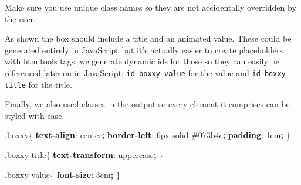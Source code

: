\documentclass[
]{krantz}
\makeatletter
\newenvironment{Shaded}{\begin{snugshade}}{\end{snugshade}}
\newcommand{\CommentTok}[1]{\textcolor[rgb]{0.37,0.37,0.37}{\textit{#1}}}
\newcommand{\ConstantTok}[1]{\textcolor[rgb]{0,0,0}{#1}}
\newcommand{\ControlFlowTok}[1]{\textcolor[rgb]{0.27,0.27,0.27}{\textbf{#1}}}
\newcommand{\DataTypeTok}[1]{\textcolor[rgb]{0.27,0.27,0.27}{#1}}
\newcommand{\DecValTok}[1]{\textcolor[rgb]{0.06,0.06,0.06}{#1}}
\newcommand{\FunctionTok}[1]{\textcolor[rgb]{0,0,0}{#1}}
\newcommand{\KeywordTok}[1]{\textcolor[rgb]{0.27,0.27,0.27}{\textbf{#1}}}
\newcommand{\NormalTok}[1]{#1}
\newcommand{\OperatorTok}[1]{\textcolor[rgb]{0.43,0.43,0.43}{\textbf{#1}}}
\newcommand{\StringTok}[1]{\textcolor[rgb]{0.5,0.5,0.5}{#1}}
\newenvironment{kframe}{%
\medskip{}
\setlength{\fboxsep}{.8em}
 \def\at@end@of@kframe{}%
 \ifinner\ifhmode%
  \def\at@end@of@kframe{\end{minipage}}%
  \begin{minipage}{\columnwidth}%
 \fi\fi%
 \def\FrameCommand##1{\hskip\@totalleftmargin \hskip-\fboxsep
 \colorbox{shadecolor}{##1}\hskip-\fboxsep
     \hskip-\linewidth \hskip-\@totalleftmargin \hskip\columnwidth}%
 \MakeFramed {\advance\hsize-\width
   \@totalleftmargin\z@ \linewidth\hsize
   \@setminipage}}%
 {\par\unskip\endMakeFramed%
 \at@end@of@kframe}
\renewenvironment{Shaded}{\begin{kframe}}{\end{kframe}}
\newenvironment{rmdblock}[1]
  {
  \begin{itemize}
  \renewcommand{\labelitemi}{
    \raisebox{-.7\height}[0pt][0pt]{
      {\setkeys{Gin}{width=3em,keepaspectratio}\texttt{[image: images/\#1]}}
    }
  }
  \setlength{\fboxsep}{1em}
  \begin{kframe}
  \item
  }
  {
  \end{kframe}
  \end{itemize}
  }
\newenvironment{rmdnote}
  {\begin{rmdblock}{note}}
  {\end{rmdblock}}
\makeatother
\begin{document}
\begin{rmdnote}
Make sure you use unique class names so they are not accidentally
overridden by the user.
\end{rmdnote}

As shown the box should include a title and an animated value. These could be generated entirely in JavaScript but it's actually easier to create placeholders with htmltools tags, we generate dynamic ids for those so they can easily be referenced later on in JavaScript: \texttt{id-boxxy-value} for the value and \texttt{id-boxxy-title} for the title.

\begin{Shaded}
\end{Shaded}

Finally, we also used classes in the output so every element it comprises can be styled with ease.

\begin{Shaded}
\begin{Highlighting}[]
\FunctionTok{.boxxy}\NormalTok{\{}
  \KeywordTok{text{-}align}\NormalTok{: }\DecValTok{center}\OperatorTok{;}
  \KeywordTok{border{-}left}\NormalTok{: }\DecValTok{6}\DataTypeTok{px} \DecValTok{solid} \ConstantTok{\#073b4c}\OperatorTok{;}
  \KeywordTok{padding}\NormalTok{: }\DecValTok{1}\DataTypeTok{em}\OperatorTok{;}
\NormalTok{\}}

\FunctionTok{.boxxy{-}title}\NormalTok{\{}
  \KeywordTok{text{-}transform}\NormalTok{: }\DecValTok{uppercase}\OperatorTok{;}
\NormalTok{\}}

\FunctionTok{.boxxy{-}value}\NormalTok{\{}
  \KeywordTok{font{-}size}\NormalTok{: }\DecValTok{3}\DataTypeTok{em}\OperatorTok{;}
\NormalTok{\}}
\end{Highlighting}
\end{Shaded}
\end{document}
